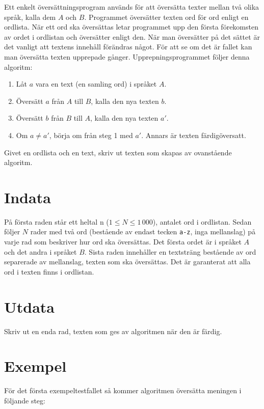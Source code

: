 Ett enkelt översättningsprogram används för att översätta texter mellan två
olika språk, kalla dem $A$ och $B$. Programmet översätter texten ord för ord enligt
en ordlista. När ett ord ska översättas letar programmet upp den första
förekomsten av ordet i ordlistan och översätter enligt den. När man översätter
på det sättet är det vanligt att textens innehåll förändras något. För att se
om det är fallet kan man översätta texten upprepade gånger. Upprepningsprogrammet
följer denna algoritm:

\begin{enumerate}
    \item Låt $a$ vara en text (en samling ord) i språket $A$.
    \item Översätt $a$ från $A$ till $B$, kalla den nya texten $b$.
    \item Översätt $b$ från $B$ till $A$, kalla den nya texten $a'$.
    \item Om $a \not = a'$, börja om från steg 1 med $a'$. Annars är texten färdigöversatt.
\end{enumerate}

Givet en ordlista och en text, skriv ut texten som skapas av ovanstående algoritm.

\section*{Indata}
På första raden står ett heltal n ($1 \leq N \leq 1\,000$), antalet ord i ordlistan.
Sedan följer $N$ rader med två ord (bestående av endast tecken \texttt{a-z},
inga mellanslag) på varje rad som beskriver hur ord ska översättas. Det första
ordet är i språket $A$ och det andra i språket $B$. Sista raden innehåller en textsträng
bestående av ord separerade av mellanslag, texten som ska översättas. Det är garanterat
att alla ord i texten finns i ordlistan.

\section*{Utdata}
Skriv ut en enda rad, texten som ges av algoritmen när den är färdig.

\section*{Exempel}
För det första exempeltestfallet så kommer algoritmen översätta meningen i följande steg:


